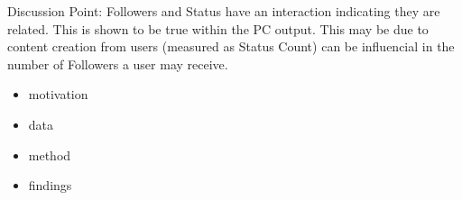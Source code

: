 Discussion Point: Followers and Status have an interaction indicating they are related. This is shown to be true within the PC output. This may be due to content creation from users (measured as Status Count) can be influencial in the number of Followers a user may receive.


\begin{itemize}
\item motivation
\item data
\item method
\item findings
\end{itemize}
